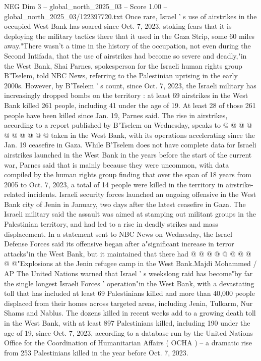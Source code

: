 \begin{textsample}{NEG Dim 3 – global\_north\_2025\_03 – Score 1.00 – global\_north\_2025\_03/122397720.txt}  \label{ex:f3_neg_437}
Once rare, Israel ' s use of airstrikes in the occupied West Bank has soared since Oct. 7, 2023, stoking fears that it is deploying the military tactics there that it used in the Gaza Strip, some 60 miles away."There wasn't a time in the history of the occupation, not even during the Second Intifada, that the use of airstrikes had become so severe and deadly,"in the West Bank, Shai Parnes, spokesperson for the Israeli human rights group B'Tselem, told NBC News, referring to the Palestinian uprising in the early 2000s.
However, by B'Tselem ' s count, since Oct. 7, 2023, the Israeli military has increasingly dropped bombs on the territory : at least 69 airstrikes in the West Bank killed 261 people, including 41 under the age of 19.
At least 28 of those 261 people have been killed since Jan. 19, Parnes said.
The rise in airstrikes, according to a report published by B'Tselem on Wednesday, speaks to @ @ @ @ @ @ @ @ @ @ taken in the West Bank, with its operations accelerating since the Jan. 19 ceasefire in Gaza.
While B'Tselem does not have complete data for Israeli airstrikes launched in the West Bank in the years before the start of the current war, Parnes said that is mainly because they were uncommon, with data compiled by the human rights group finding that over the span of 18 years from 2005 to Oct. 7, 2023, a total of 14 people were killed in the territory in airstrike-related incidents.
Israeli security forces launched an ongoing offensive in the West Bank city of Jenin in January, two days after the latest ceasefire in Gaza.
The Israeli military said the assault was aimed at stamping out militant groups in the Palestinian territory, and had led to a rise in deadly strikes and mass displacement.
In a statement sent to NBC News on Wednesday, the Israel Defense Forces said its offensive began after a"significant increase in terror attacks"in the West Bank, but it maintained that there had @ @ @ @ @ @ @ @ @ @"Explosions at the Jenin refugee camp in the West Bank.Majdi Mohammed / AP The United Nations warned that Israel ' s weekslong raid has become"by far the single longest Israeli Forces ' operation"in the West Bank, with a devastating toll that has included at least 69 Palestinians killed and more than 40,000 people displaced from their homes across targeted areas, including Jenin, Tulkarm, Nur Shams and Nablus.
The dozens killed in recent weeks add to a growing death toll in the West Bank, with at least 897 Palestinians killed, including 190 under the age of 19, since Oct. 7, 2023, according to a database run by the United Nations Office for the Coordination of Humanitarian Affairs ( OCHA ) -- a dramatic rise from 253 Palestinians killed in the year before Oct. 7, 2023.

\end{textsample}
